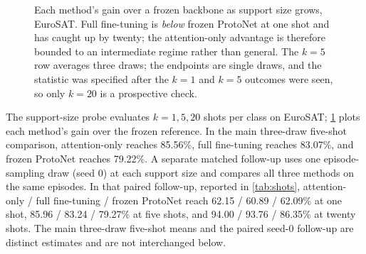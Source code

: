 \documentclass[11pt]{article}
\begin{document}
\begin{figure}[t]
\centering
{}
\caption{Each method's gain over a frozen backbone as support size grows,
EuroSAT. Full fine-tuning is \emph{below} frozen ProtoNet at one shot and has
caught up by twenty; the attention-only advantage is therefore bounded to an
intermediate regime rather than general. The $k=5$ row averages three draws; the
endpoints are single draws, and the statistic was specified after the $k=1$ and
$k=5$ outcomes were seen, so only $k=20$ is a prospective check.}
\label{fig:shots}
\end{figure}

\label{sec:shots}

The support-size probe evaluates $k=1,5,20$ shots per class on EuroSAT; \cref{fig:shots} plots each method's gain over the frozen reference. In the main three-draw five-shot comparison, attention-only reaches 85.56\%, full fine-tuning reaches 83.07\%, and frozen ProtoNet reaches 79.22\%. A separate matched follow-up uses one episode-sampling draw (seed 0) at each support size and compares all three methods on the same episodes. In that paired follow-up, reported in \cref{tab:shots}, attention-only / full fine-tuning / frozen ProtoNet reach 62.15 / 60.89 / 62.09\% at one shot, 85.96 / 83.24 / 79.27\% at five shots, and 94.00 / 93.76 / 86.35\% at twenty shots. The main three-draw five-shot means and the paired seed-0 follow-up are distinct estimates and are not interchanged below.
\end{document}
